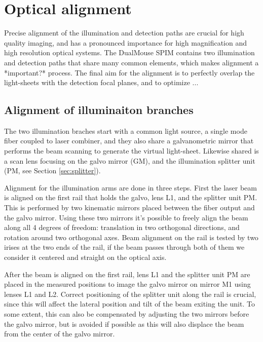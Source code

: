 \section{Optical alignment}
Precise alignment of the illumination and detection paths are crucial for high quality imaging, and has a pronounced  importance for high magnification and high resolution optical systems. The DualMouse SPIM contains two illumination and detection paths that share many common elements, which makes alignment a *important?* process. The final aim for the alignment is to perfectly overlap the light-sheets with the detection focal planes, and to optimize ... 

\subsection{Alignment of illuminaiton branches}

The two illumination braches start with a common light source, a single mode fiber coupled to laser combiner, and they also share a galvanometric mirror that performs the beam scanning to generate the virtual light-sheet. Likewise shared is a scan lens focusing on the galvo mirror (GM), and the illumination splitter unit (PM, see Section \ref{sec:splitter}).

Alignment for the illumination arms are done in three steps. First the laser beam is aligned on the first rail that holds the galvo, lens L1, and the splitter unit PM. This is performed by two kinematic mirrors placed between the fiber output and the galvo mirror. Using these two mirrors it's possible to freely align the beam along all 4 degrees of freedom: translation in two orthogonal directions, and rotation around two orthogonal axes. Beam alignment on the rail is tested by two irises at the two ends of the rail, if the beam passes through both of them we consider it centered and straight on the optical axis.

After the beam is aligned on the first rail, lens L1 and the splitter unit PM are placed in the measured positions to image the galvo mirror on mirror M1 using lenses L1 and L2. Correct positioning of the splitter unit along the rail is crucial, since this will affect the lateral position and tilt of the beam exiting the unit. To some extent, this can also be compensated by adjusting the two mirrors before the galvo mirror, but is avoided if possible as this will also displace the beam from the center of the galvo mirror.

